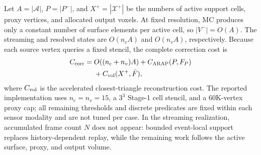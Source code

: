 Let $A=|\mathcal A|$, $P=|P^-|$, and $X^+=|\mathcal X^+|$ be the numbers of
active support cells, proxy vertices, and allocated output voxels. At fixed
resolution, MC produces only a constant number of surface elements per active
cell, so $|V^-|=O(A)$. The streaming and resolved states are $O(n_cA)$ and
$O(n_vA)$, respectively. Because each source vertex queries a fixed stencil,
the complete correction cost is
\begin{equation}
\begin{aligned}
C_{\rm corr}={}&O((n_c+n_v)A)+C_{\rm ARAP}(P,F_P)\\
&+C_{\rm vol}(X^+,\bar F),
\end{aligned}
\label{eq:complexity}
\end{equation}
where $C_{\rm vol}$ is the accelerated closest-triangle reconstruction cost.
The reported implementation uses $n_c=n_v=15$, a $3^3$ Stage-1 cell stencil,
and a 60K-vertex proxy cap; all remaining thresholds and discrete predicates
are fixed within each sensor modality and are not tuned per case. In the
streaming realization, accumulated frame count $N$ does not appear: bounded
event-local support replaces history-dependent replay, while the remaining
work follows the active surface, proxy, and output volume.
